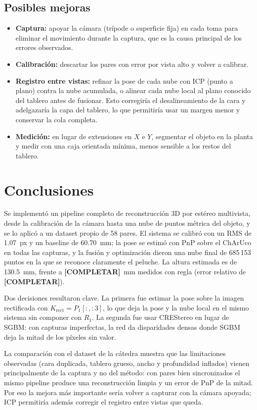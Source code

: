 \documentclass[conference]{IEEEtran}
\newcommand{\alturareal}{\textbf{[COMPLETAR]}}
\newcommand{\errorrel}{\textbf{[COMPLETAR]}}
\begin{document}
\subsection{Posibles mejoras}

\begin{itemize}
  \item \textbf{Captura:} apoyar la cámara (trípode o superficie fija) en
        cada toma para eliminar el movimiento durante la captura, que es la
        causa principal de los errores observados.
  \item \textbf{Calibración:} descartar los pares con error por vista
        alto y volver a calibrar.
  \item \textbf{Registro entre vistas:} refinar la pose de cada nube con
        ICP (punto a plano) contra la nube acumulada, o alinear cada nube
        local al plano conocido del tablero antes de fusionar. Esto
        corregiría el desalineamiento de la cara y adelgazaría la capa del
        tablero, lo que permitiría usar un margen menor y conservar la cola
        completa.
  \item \textbf{Medición:} en lugar de extensiones en $X$ e $Y$, segmentar
        el objeto en la planta y medir con una caja orientada mínima,
        menos sensible a los restos del tablero.
\end{itemize}

\section{Conclusiones}

Se implementó un pipeline completo de reconstrucción 3D por estéreo
multivista, desde la calibración de la cámara hasta una nube de puntos
métrica del objeto, y se lo aplicó a un dataset propio de 58 pares. El
sistema se calibró con un RMS de 1.07~px y un baseline de 60.70~mm; la pose
se estimó con PnP sobre el ChArUco en todas las capturas, y la fusión y
optimización dieron una nube final de 685\,153 puntos en la que se reconoce
claramente el peluche. La altura estimada es de 130.5~mm, frente a
\alturareal~mm medidos con regla (error relativo de \errorrel).

Dos decisiones resultaron clave. La primera fue estimar la pose sobre la
imagen rectificada con $K_{\text{rect}}=P_1[:, :3]$, lo que deja la pose y
la nube local en el mismo sistema sin componer con $R_1$. La segunda fue
usar CREStereo en lugar de SGBM: con capturas imperfectas, la red da
disparidades densas donde SGBM deja la mitad de los píxeles sin valor.

La comparación con el dataset de la cátedra muestra que las limitaciones
observadas (cara duplicada, tablero grueso, ancho y profundidad inflados)
vienen principalmente de la captura y no del método: con pares bien
sincronizados el mismo pipeline produce una reconstrucción limpia y un
error de PnP de la mitad. Por eso la mejora más importante sería volver a
capturar con la cámara apoyada; ICP permitiría además corregir el registro
entre vistas que queda.
\end{document}
